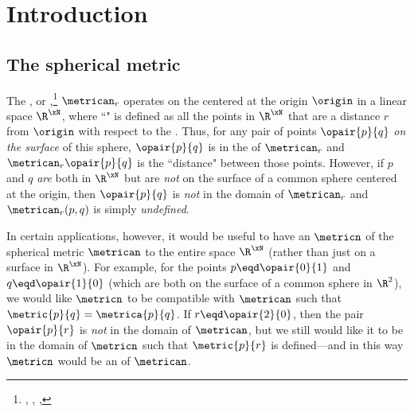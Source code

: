 \section{Introduction}
\subsection{The spherical metric}
The , or ,\footnote{
  ,
  ,
  ,
  }
$\metrican_r$ operates on the 
centered at the origin $\origin$ in a linear space $\R^\xN$,
where ``" is defined as all the points 
in $\R^\xN$ that are a distance $r$ from $\origin$ with respect to the 
 .
Thus, for any pair of points $\opair{p}{q}$ \emph{on the surface} of this sphere,
$\opair{p}{q}$ is in the  of $\metrican_r$ and 
$\metrican_r\opair{p}{q}$ is the ``distance" between those points.
However, if $p$ and $q$ \emph{are} both in $\R^\xN$ but are \emph{not} on the surface of a    %
common sphere centered at the origin, then $\opair{p}{q}$ is \emph{not} in the domain
of $\metrican_r$ and $\metrican_r(p,q)$ is simply \emph{undefined}.                             %

In certain applications, however, it would be useful to have an  $\metricn$
of the spherical metric $\metrican$ to the entire space $\R^\xN$ (rather than just on a surface in $\R^\xN$).  %
For example, for the points $p\eqd\opair{0}{1}$ and $q\eqd\opair{1}{0}$
(which are both on the surface of a common sphere in $\R^2$),
we would like $\metricn$ to be compatible with $\metrican$ such that $\metric{p}{q}=\metrica{p}{q}$.
If $r\eqd\opair{2}{0}$, then the pair $\opair{p}{r}$ is \emph{not} in the domain of $\metrican$,
but we still would like it to be in the domain of $\metricn$ such that $\metric{p}{r}$ is defined---and 
in this way $\metricn$ would be an  of $\metrican$.                                                                        %

